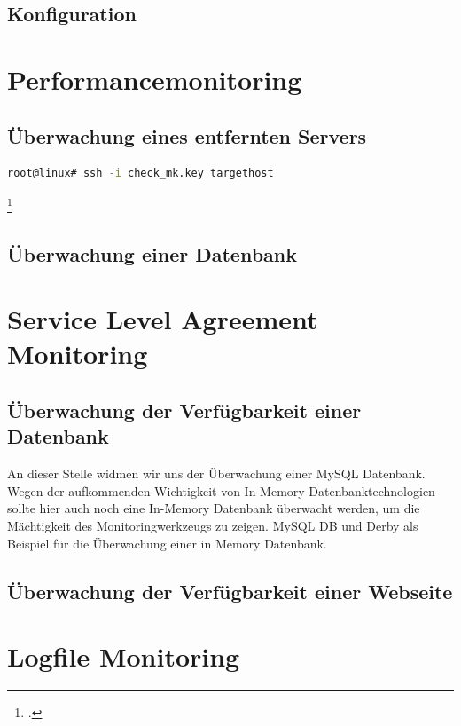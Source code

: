 \documentclass[12pt,a4paper,parskip,listof=totoc,bibliography=totoc]{scrreprt}
\begin{document}
	\subsection{Konfiguration}
	
	\section{Performancemonitoring}
	\subsection{Überwachung eines entfernten Servers}
	\begin{lstlisting}[language=bash]
	root@linux# ssh -i check_mk.key targethost
	\end{lstlisting} \footcite{checkmkCheckBySSH2015}
	\subsection{Überwachung einer Datenbank}
	\section{Service Level Agreement Monitoring}
	\subsection{Überwachung der Verfügbarkeit einer Datenbank}
	An dieser Stelle widmen wir uns der Überwachung einer MySQL Datenbank. 
	Wegen der aufkommenden Wichtigkeit von In-Memory Datenbanktechnologien sollte hier auch noch eine In-Memory Datenbank überwacht werden, um die Mächtigkeit des Monitoringwerkzeugs zu zeigen.
	MySQL DB und Derby als Beispiel für die Überwachung einer in Memory Datenbank.
	\subsection{Überwachung der Verfügbarkeit einer Webseite}
	\section{Logfile Monitoring}
	
	\printbibliography 
	\printglossary[title=Abkürzungsverzeichnis, type=\acronymtype] %
	\listoffigures %
\end{document}
